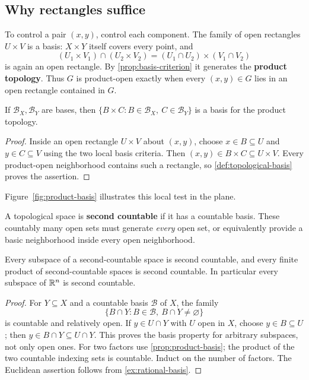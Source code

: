 \subsection{Why rectangles suffice}
To control a pair $(x,y)$, control each component. The family of open
rectangles $U\times V$ is a basis: $X\times Y$ itself covers every point,
and
\[
(U_1\times V_1)\cap(U_2\times V_2)
=(U_1\cap U_2)\times(V_1\cap V_2)
\]
is again an open rectangle. By \cref{prop:basis-criterion} it generates
the \textbf{product topology}. Thus $G$ is product-open exactly when every
$(x,y)\in G$ lies in an open rectangle contained in $G$.
\begin{proposition}\label{prop:product-basis}
If $\mathcal B_X,\mathcal B_Y$ are bases, then
$\{B\times C:B\in\mathcal B_X,\ C\in\mathcal B_Y\}$ is a basis for
the product topology.
\end{proposition}
\begin{proof}
Inside an open rectangle $U\times V$ about $(x,y)$, choose
$x\in B\subseteq U$ and $y\in C\subseteq V$ using the two local basis
criteria. Then $(x,y)\in B\times C\subseteq U\times V$.
Every product-open neighborhood contains such a rectangle, so
\cref{def:topological-basis} proves the assertion.
\end{proof}
Figure~\ref{fig:product-basis} illustrates this local test in the plane.

\FloatBarrier

\begin{definition}\label{def:second-countable}
A topological space is \textbf{second countable} if it has a countable
basis. These countably many open sets must generate \emph{every} open set,
or equivalently provide a basic neighborhood inside every open neighborhood.
\end{definition}
\begin{proposition}\label{prop:second-countable-inheritance}
Every subspace of a second-countable space is second countable, and every
finite product of second-countable spaces is second countable.
In particular every subspace of $\mathbb{R}^n$ is second countable.
\end{proposition}
\begin{proof}
For $Y\subseteq X$ and a countable basis $\mathcal B$ of $X$, the family
\[
\{B\cap Y:B\in\mathcal B,\ B\cap Y\ne\varnothing\}
\]
is countable and relatively open. If $y\in U\cap Y$ with $U$ open in
$X$, choose $y\in B\subseteq U$; then $y\in B\cap Y\subseteq U\cap Y$.
This proves the basis property for arbitrary subspaces, not only open ones.
For two factors use \cref{prop:product-basis}; the product of the two
countable indexing sets is countable. Induct on the number of factors.
The Euclidean assertion follows from \cref{ex:rational-basis}.
\end{proof}

